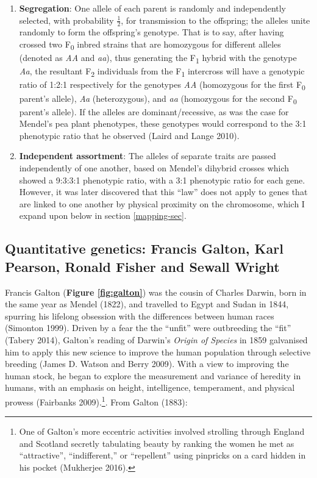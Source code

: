 \documentclass[
]{book}
\begin{document}
\begin{enumerate}
\def\labelenumi{\arabic{enumi}.}
\item
  \textbf{Segregation}: One allele of each parent is randomly and independently selected, with probability \(\frac{1}{2}\), for transmission to the offspring; the alleles unite randomly to form the offspring's genotype. That is to say, after having crossed two F\textsubscript{0} inbred strains that are homozygous for different alleles (denoted as \emph{AA} and \emph{aa}), thus generating the F\textsubscript{1} hybrid with the genotype \emph{Aa}, the resultant F\textsubscript{2} individuals from the F\textsubscript{1} intercross will have a genotypic ratio of 1:2:1 respectively for the genotypes \emph{AA} (homozygous for the first F\textsubscript{0} parent's allele), \emph{Aa} (heterozygous), and \emph{aa} (homozygous for the second F\textsubscript{0} parent's allele). If the alleles are dominant/recessive, as was the case for Mendel's pea plant phenotypes, these genotypes would correspond to the 3:1 phenotypic ratio that he observed (Laird and Lange 2010).
\item
  \textbf{Independent assortment}: The alleles of separate traits are passed independently of one another, based on Mendel's dihybrid crosses which showed a 9:3:3:1 phenotypic ratio, with a 3:1 phenotypic ratio for each gene. However, it was later discovered that this ``law'' does not apply to genes that are linked to one another by physical proximity on the chromosome, which I expand upon below in section \ref{mapping-sec}.
\end{enumerate}

\hypertarget{quantitative-genetics-francis-galton-karl-pearson-ronald-fisher-and-sewall-wright}{%
\subsection{Quantitative genetics: Francis Galton, Karl Pearson, Ronald Fisher and Sewall Wright}\label{quantitative-genetics-francis-galton-karl-pearson-ronald-fisher-and-sewall-wright}}

Francis Galton (\textbf{Figure \ref{fig:galton}}) was the cousin of Charles Darwin, born in the same year as Mendel (1822), and travelled to Egypt and Sudan in 1844, spurring his lifelong obsession with the differences between human races (Simonton 1999). Driven by a fear the the ``unfit'' were outbreeding the ``fit'' (Tabery 2014), Galton's reading of Darwin's \emph{Origin of Species} in 1859 galvanised him to apply this new science to improve the human population through selective breeding (James D. Watson and Berry 2009). With a view to improving the human stock, he began to explore the measurement and variance of heredity in humans, with an emphasis on height, intelligence, temperament, and physical prowess (Fairbanks 2009).\footnote{One of Galton's more eccentric activities involved strolling through England and Scotland secretly tabulating beauty by ranking the women he met as ``attractive'', ``indifferent,'' or ``repellent'' using pinpricks on a card hidden in his pocket (Mukherjee 2016).}. From Galton (1883):
\end{document}
